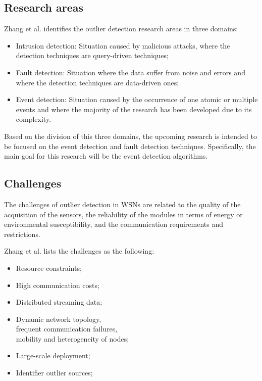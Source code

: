 \subsection{Research areas}
Zhang et al. \cite{gen:zhang:2010} identifies the outlier detection research areas in three domains: 

\begin{itemize}
	\item Intrusion detection: Situation caused by malicious attacks, where the detection techniques are query-driven techniques;
	
	\item Fault detection: Situation where the data suffer from noise and errors and where the detection techniques are data-driven ones;
	
	\item Event detection: Situation caused by the occurrence of one atomic or multiple events and where the majority of the research has been developed due to its complexity.
\end{itemize}

Based on the division of this three domains, the upcoming research is intended to be focused on the event detection and fault detection techniques. Specifically, the main goal for this research will be the event detection algorithms.


\subsection{Challenges}

The challenges of outlier detection in WSNs are related to the quality of the acquisition of the sensors, the reliability of the modules in terms of energy or environmental susceptibility, and the communication requirements and restrictions.

Zhang et al. \cite{gen:zhang:2010} lists the challenges as the following:

\begin{itemize}
	\setlength\itemsep{-0.5em}
	
	\item Resource constraints;
	
	\item High communication costs;
	
	\item Distributed streaming data;
	
	\item Dynamic network topology, \\ frequent communication failures, \\ mobility and heterogeneity of nodes;
	
	\item Large-scale deployment;
	
	\item Identifier outlier sources;
	
\end{itemize}


